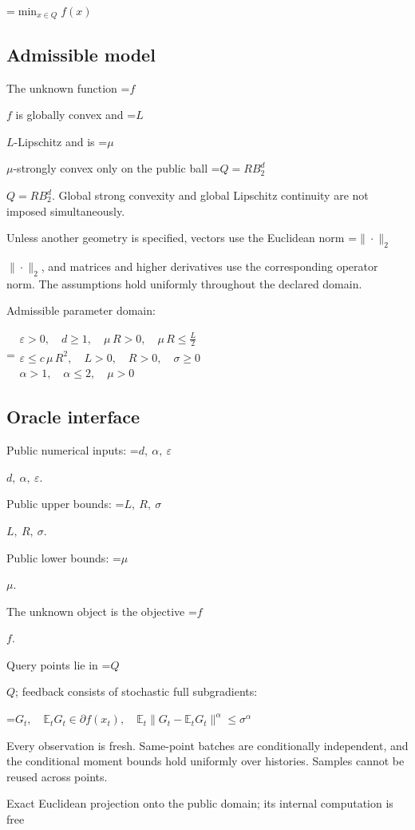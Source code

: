 \documentclass[10pt,a4paper]{article}
\newcommand{\AtlasMath}[1]{\par\begingroup\centering\setbox0=\hbox{$\displaystyle #1$}\ifdim\wd0>1.4\linewidth\typeout{ATLAS WIDE FORMULA: \the\wd0}\fi\ifdim\wd0>\linewidth\resizebox{\linewidth}{!}{\box0}\else\box0\fi\par\endgroup}
\newcommand{\AtlasInlineMath}[1]{\begingroup\setbox0=\hbox{$#1$}\ifdim\wd0>.4\linewidth\endgroup\AtlasMath{#1}\else\endgroup$#1$\fi}
\begin{document}
\AtlasMath{\min_{x\in Q}f(x)}


\subsection{Admissible model}
The unknown function \AtlasInlineMath{f} is globally convex and \AtlasInlineMath{L}-Lipschitz and is \AtlasInlineMath{\mu}-strongly convex only on the public ball \AtlasInlineMath{Q=RB_2^d}. Global strong convexity and global Lipschitz continuity are not imposed simultaneously.

Unless another geometry is specified, vectors use the Euclidean norm \AtlasInlineMath{\|\cdot\|_2}, and matrices and higher derivatives use the corresponding operator norm. The assumptions hold uniformly throughout the declared domain.

Admissible parameter domain:


\AtlasMath{\begin{gathered}\varepsilon > 0,\quad d \ge 1,\quad \mu\,R > 0,\quad \mu\,R \le \frac{L}{2}\\\varepsilon \le c\,\mu\,{R}^{2},\quad L > 0,\quad R > 0,\quad \sigma \ge 0\\\alpha > 1,\quad \alpha \le 2,\quad \mu > 0\end{gathered}}


\subsection{Oracle interface}
Public numerical inputs: \AtlasInlineMath{d,\ \alpha,\ \varepsilon}.

Public upper bounds: \AtlasInlineMath{L,\ R,\ \sigma}.

Public lower bounds: \AtlasInlineMath{\mu}.

The unknown object is the objective \AtlasInlineMath{f}.

Query points lie in \AtlasInlineMath{Q}; feedback consists of stochastic full subgradients:


\AtlasMath{G_t,\quad \mathbb{E}_tG_t\in\partial f(x_t),\quad\mathbb{E}_t\|G_t-\mathbb{E}_tG_t\|^\alpha\le\sigma^\alpha}


Every observation is fresh. Same-point batches are conditionally independent, and the conditional moment bounds hold uniformly over histories. Samples cannot be reused across points.

Exact Euclidean projection onto the public domain; its internal computation is free
\end{document}
